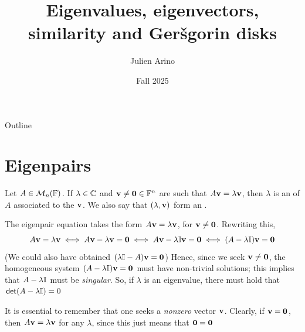 \documentclass[aspectratio=169]{beamer}
\title{Eigenvalues, eigenvectors, similarity and Ger\v{s}gorin disks}
\author{Julien Arino}
\date{Fall 2025}
\begin{document}
\begin{frame}
	\titlepage
\end{frame}
\addtocounter{page}{-1}
  
  
\begin{frame}{Outline}
	  \tableofcontents[hideallsubsections]
\end{frame}
\addtocounter{page}{-1}


\section{Eigenpairs}


\begin{frame}
\begin{definition}\label{def:eigenvalue}
Let $A\in \mathcal{M}_{n}(\mathbb{F})$. If $\lambda\in \mathbb{C}$ and $\bv\neq\b0\in \IF^n$ are such that $A\mathbf{v}=\lambda\mathbf{v}$, then $\lambda$ is an  of $A$ associated to the  $\mathbf{v}$. We also say that $(\lambda, \mathbf{v})$ form an .
\end{definition}
\end{frame}


\begin{frame}
The eigenpair equation takes the form $A\mathbf{v}= \lambda\mathbf{v}$, for $\bv\neq\b0$. Rewriting this,
\[
A\bv=\lambda\bv \iff A\bv-\lambda\bv = \b0 \iff A\bv-\lambda\II\bv=\b0\iff (A-\lambda \II)\bv=\b0
\]
(We could also have obtained $(\lambda\II-A)\bv=\b0$)
\vfill
Hence, since we seek $\bv\neq\b0$, the homogeneous system $(A-\lambda\II)\bv=\b0$ must have non-trivial solutions; this implies that $A-\lambda\mathbb{I}$ must be \emph{singular}. So, if $\lambda$ is an eigenvalue, there must hold that $\mathsf{det}(A-\lambda\mathbb{I})=0$ 
\vfill
\begin{remark}
It is essential to remember that one seeks a \emph{nonzero} vector $\mathbf{v}$. Clearly, if $\bv=\b0$, then $A\mathbf{v}=\lambda\mathbf{v}$ for any $\lambda$, since this just means that $\b0=\b0$
\end{remark}
\end{frame}
\end{document}
